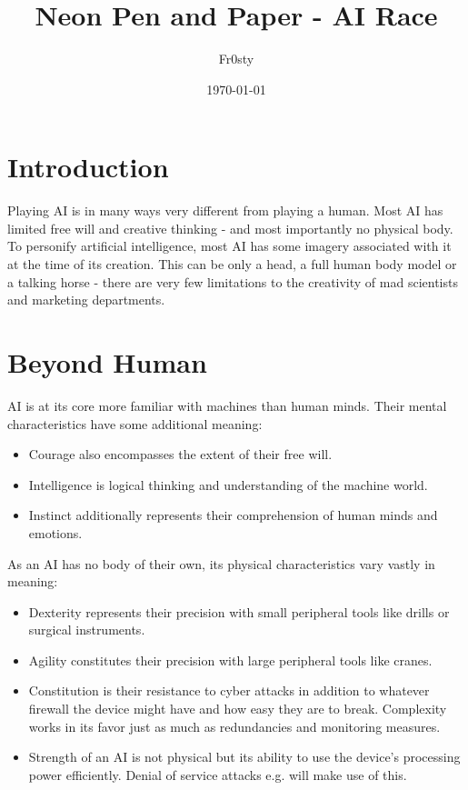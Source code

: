 \documentclass[12pt,a4paper]{book}
\title{Neon Pen and Paper - AI Race}
\author{Fr0sty}
\date{\today}
\begin{document}
	\maketitle
	\tableofcontents
	
	\chapter{Introduction}
	Playing AI is in many ways very different from playing a human. Most AI has limited free will and creative thinking - and most importantly no physical body. To personify artificial intelligence, most AI has some imagery associated with it at the time of its creation. This can be only a head, a full human body model or a talking horse - there are very few limitations to the creativity of mad scientists and marketing departments.
	
	\chapter{Beyond Human}
	AI is at its core more familiar with machines than human minds. Their mental characteristics have some additional meaning:
	\begin{itemize}
		\item Courage also encompasses the extent of their free will.
		\item Intelligence is logical thinking and understanding of the machine world.
		\item Instinct additionally represents their comprehension of human minds and emotions.
	\end{itemize}
	
	As an AI has no body of their own, its physical characteristics vary vastly in meaning:
	\begin{itemize}
		\item Dexterity represents their precision with small peripheral tools like drills or surgical instruments.
		\item Agility constitutes their precision with large peripheral tools like cranes.
		\item Constitution is their resistance to cyber attacks in addition to whatever firewall the device might have and how easy they are to break. Complexity works in its favor just as much as redundancies and monitoring measures.
		\item Strength of an AI is not physical but its ability to use the device’s processing power efficiently. Denial of service attacks e.g. will make use of this.
	\end{itemize}
	
\end{document}
